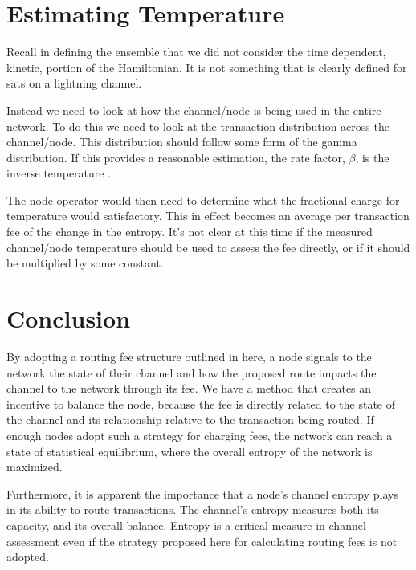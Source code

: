 \documentclass[review,12pt]{elsarticle}
\begin{document}
\section{Estimating Temperature}
Recall in defining the ensemble that we did not consider the time dependent, kinetic, portion of the Hamiltonian.
It is not something that is clearly defined for sats on a lightning channel.

Instead we need to look at how the channel/node is being used in the entire network.
To do this we need to look at the transaction distribution across the channel/node.
This distribution should follow some form of the gamma distribution.
If this provides a reasonable estimation, the rate factor, $\beta$, is the inverse temperature \cite[p.~76]{Gibbs:1902}.

The node operator would then need to determine what the fractional charge for temperature would satisfactory.
This in effect becomes an average per transaction fee of the change in the entropy.
It's not clear at this time if the measured channel/node temperature should be used to assess the fee directly, or if it should be multiplied by some constant.

\section{Conclusion}
By adopting a routing fee structure outlined in here, a node signals to the network the state of their channel and how the proposed route impacts the channel to the network through its fee.
We have a method that creates an incentive to balance the node, because the fee is directly related to the state of the channel and its relationship relative to the transaction being routed.
If enough nodes adopt such a strategy for charging fees, the network can reach a state of statistical equilibrium, where the overall entropy of the network is maximized.

Furthermore, it is apparent the importance that a node's channel entropy plays in its ability to route transactions.
The channel's entropy measures both its capacity, and its overall balance.
Entropy is a critical measure in channel assessment even if the strategy proposed here for calculating routing fees is not adopted.




\end{document}
